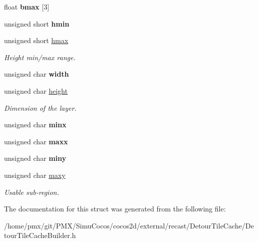 \begin{DoxyCompactItemize}
float {\bfseries bmax} \mbox{[}3\mbox{]}
\item 
\mbox{\label{structdtTileCacheLayerHeader_ac67e4ecbb71ab3814e9e270f14004ee9}} 
unsigned short {\bfseries hmin}
\item 
\mbox{\label{structdtTileCacheLayerHeader_a1a39cf584edf04f90b05b38f1979f13d}} 
unsigned short \hyperlink{structdtTileCacheLayerHeader_a1a39cf584edf04f90b05b38f1979f13d}{hmax}
\begin{DoxyCompactList}\small\item\em Height min/max range. \end{DoxyCompactList}\item 
\mbox{\label{structdtTileCacheLayerHeader_a967e7b1b310ae0a5a90168727c146f4c}} 
unsigned char {\bfseries width}
\item 
\mbox{\label{structdtTileCacheLayerHeader_a3ea2f3a128e73e23879575725142d5fb}} 
unsigned char \hyperlink{structdtTileCacheLayerHeader_a3ea2f3a128e73e23879575725142d5fb}{height}
\begin{DoxyCompactList}\small\item\em Dimension of the layer. \end{DoxyCompactList}\item 
\mbox{\label{structdtTileCacheLayerHeader_ac536f24cbc32f35d0a42bd23f6ac1a56}} 
unsigned char {\bfseries minx}
\item 
\mbox{\label{structdtTileCacheLayerHeader_ab675bd252447bcae38a8356b627af383}} 
unsigned char {\bfseries maxx}
\item 
\mbox{\label{structdtTileCacheLayerHeader_a4e0f98a4b6cba8baf300311feb2700e2}} 
unsigned char {\bfseries miny}
\item 
\mbox{\label{structdtTileCacheLayerHeader_afcbde7458c37c89801243b98a5aa4674}} 
unsigned char \hyperlink{structdtTileCacheLayerHeader_afcbde7458c37c89801243b98a5aa4674}{maxy}
\begin{DoxyCompactList}\small\item\em Usable sub-\/region. \end{DoxyCompactList}\end{DoxyCompactItemize}


The documentation for this struct was generated from the following file\+:\begin{DoxyCompactItemize}
\item 
/home/pmx/git/\+P\+M\+X/\+Simu\+Cocos/cocos2d/external/recast/\+Detour\+Tile\+Cache/Detour\+Tile\+Cache\+Builder.\+h\end{DoxyCompactItemize}
